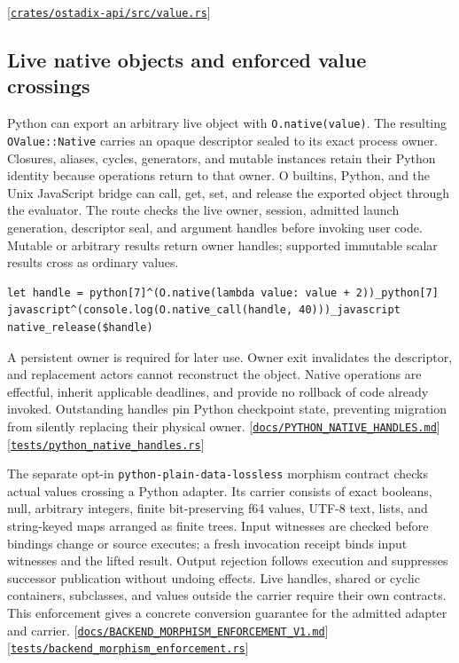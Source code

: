 \documentclass[11pt,oneside]{article}
\newcommand{\src}[1]{\textcolor{OSlate}{\scriptsize[\href{https://github.com/lostadi/OSTADIX/blob/c0b02c326b2329a95ba52447c7180bc93957cd57/#1}{\nolinkurl{#1}}]}\allowbreak}
\begin{document}
\src{crates/ostadix-api/src/value.rs}

\subsection{Live native objects and enforced value crossings}

Python can export an arbitrary live object with \texttt{O.native(value)}.
The resulting \texttt{OValue::Native} carries an opaque descriptor sealed to
its exact process owner. Closures, aliases, cycles, generators, and mutable
instances retain their Python identity because operations return to that owner.
O builtins, Python, and the Unix JavaScript bridge can call, get, set, and
release the exported object through the evaluator. The route checks the live
owner, session, admitted launch generation, descriptor seal, and argument
handles before invoking user code. Mutable or arbitrary results return owner
handles; supported immutable scalar results cross as ordinary values.

\begin{lstlisting}[style=ostyle]
let handle = python[7]^(O.native(lambda value: value + 2))_python[7]
javascript^(console.log(O.native_call(handle, 40)))_javascript
native_release($handle)
\end{lstlisting}

A persistent owner is required for later use. Owner exit invalidates the
descriptor, and replacement actors cannot reconstruct the object. Native
operations are effectful, inherit applicable deadlines, and provide no
rollback of code already invoked. Outstanding handles pin Python checkpoint
state, preventing migration from silently replacing their physical owner.
\src{docs/PYTHON_NATIVE_HANDLES.md}
\src{tests/python_native_handles.rs}

The separate opt-in \texttt{python-plain-data-lossless} morphism contract
checks actual values crossing a Python adapter. Its carrier consists of exact
booleans, null, arbitrary integers, finite bit-preserving f64 values, UTF-8
text, lists, and string-keyed maps arranged as finite trees. Input witnesses
are checked before bindings change or source executes; a fresh invocation
receipt binds input witnesses and the lifted result. Output rejection follows
execution and suppresses successor publication without undoing effects.
Live handles, shared or cyclic containers, subclasses, and values outside the
carrier require their own contracts. This enforcement gives a concrete
conversion guarantee for the admitted adapter and carrier.
\src{docs/BACKEND_MORPHISM_ENFORCEMENT_V1.md}
\src{tests/backend_morphism_enforcement.rs}
\end{document}
